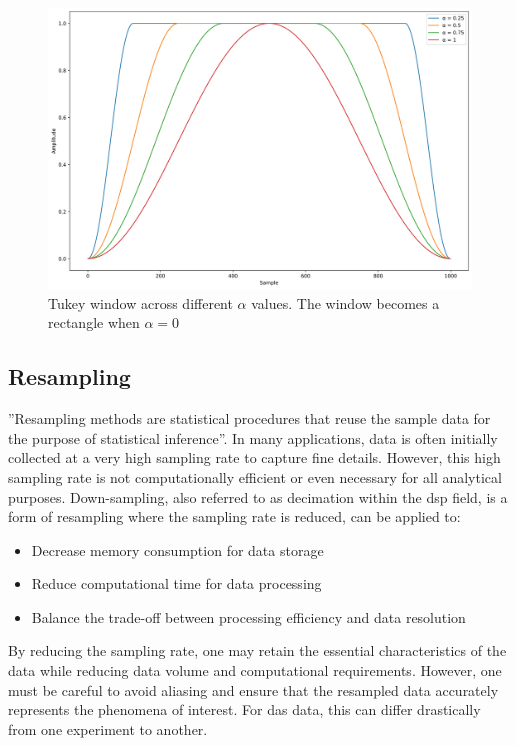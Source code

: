 \begin{figure}[!h]
    \centering
    \includegraphics[width=0.6\linewidth]{figures/tukey_windows_high_res.jpg}
    \caption{Tukey window across different $\alpha$ values. The window becomes a rectangle when $\alpha = 0$}
    \label{fig:tukeywindow}
\end{figure}

\clearpage
\subsection{Resampling}

''Resampling methods are statistical procedures that reuse the sample data for the purpose of statistical inference''\cite{https://doi.org/10.1002/widm.1054}. In many applications, data is often initially collected at a very high sampling rate to capture fine details. However, this high sampling rate is not computationally efficient or even necessary for all analytical purposes. Down-sampling, also referred to as decimation within the \acrshort{dsp} field, is a form of resampling where the sampling rate is reduced, can be applied to:

\begin{itemize}
    \item Decrease memory consumption for data storage
    \item Reduce computational time for data processing
    \item Balance the trade-off between processing efficiency and data resolution
\end{itemize}

By reducing the sampling rate, one may retain the essential characteristics of the data while reducing data volume and computational requirements. However, one must be careful to avoid aliasing and ensure that the resampled data accurately represents the phenomena of interest. For \acrshort{das} data, this can differ drastically from one experiment to another. 

